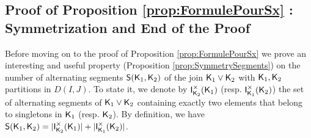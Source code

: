 \documentclass[11pt, a4paper, oneside, reqno]{amsart}
\newcommand{\sK}{{\sf K}}
\newcommand{\setK}{{D(I,J)}}
\newcommand{\sM}{{\sf M}}
\newtheorem{lemma}[theorem]{Lemma}
\theoremstyle{remark}
\theoremstyle{definition}
\numberwithin{equation}{section}
\begin{document}
\subsection{Proof of Proposition \ref{prop:FormulePourSx} : Symmetrization and End of the Proof} Before moving on to the proof of Proposition \ref{prop:FormulePourSx} we prove an interesting and useful property (Proposition \ref{prop:SymmetrySegments}) on the number of alternating segments ${\sf S}(\sK_1,\sK_2)$ of the join $\sK_1 \vee \sK_2$ with $\sK_1, \sK_2$ partitions in $\setK$. To state it, we denote by ${\sf I}_{\sK_2}^{\times}({\sK_1})$ (resp. ${\sf I}_{\sK_1}^{\times}({\sK_2})$) the set of alternating segments of $\sK_1 \vee \sK_2$ containing exactly two elements that belong to singletons in ${\sK}_1$ (resp. ${\sK}_2$). By definition, we have ${\sf S}(\sK_1, \sK_2)=|{\sf I}_{\sK_2}^{\times}({\sK_1})| + |{\sf I}_{\sK_1}^{\times}({\sK_2})| $. 

   


\end{document}
